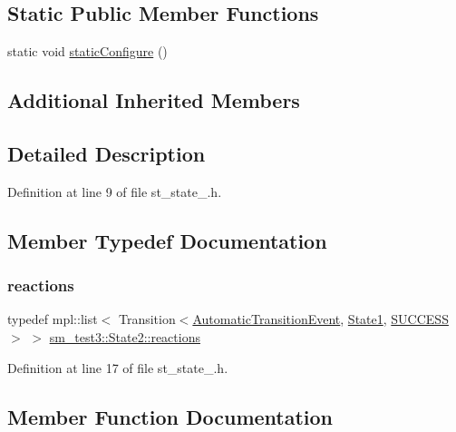 \subsection*{Static Public Member Functions}
\begin{DoxyCompactItemize}
\item 
static void \hyperlink{structsm__test3_1_1State2_a8e2e375b60d84b9963cda81d9733e9da}{static\+Configure} ()
\end{DoxyCompactItemize}
\subsection*{Additional Inherited Members}


\subsection{Detailed Description}


Definition at line 9 of file st\+\_\+state\+\_.\+h.



\subsection{Member Typedef Documentation}
\mbox{\label{structsm__test3_1_1State2_a5ba69a45160e9af742cf6077167a3a15}} 
\subsubsection{\texorpdfstring{reactions}{reactions}}
{\footnotesize\ttfamily typedef mpl\+::list$<$ Transition$<$\hyperlink{structsm__test3_1_1AutomaticTransitionEvent}{Automatic\+Transition\+Event}, \hyperlink{structsm__test3_1_1State1}{State1}, \hyperlink{classSUCCESS}{S\+U\+C\+C\+E\+SS}$>$ $>$ \hyperlink{structsm__test3_1_1State2_a5ba69a45160e9af742cf6077167a3a15}{sm\+\_\+test3\+::\+State2\+::reactions}}



Definition at line 17 of file st\+\_\+state\+\_.\+h.



\subsection{Member Function Documentation}
\mbox{\label{structsm__test3_1_1State2_a2636f08d6bbfe258c2a3c8dd966e1028}} 
